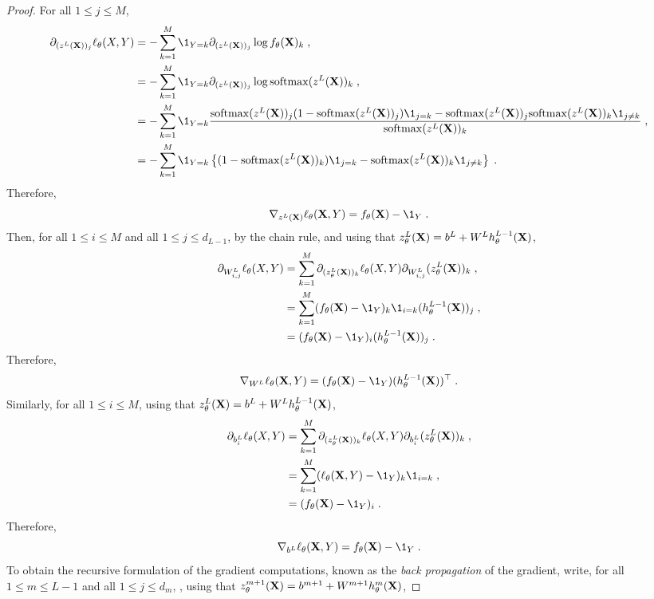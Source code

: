 \begin{proof}
For all $1\leqslant j\leqslant M$,
\begin{align*}
\partial_{(z^L(\bX))_j}\ell_{\theta}(X,Y) &=  -\sum_{k=1}^{M} \1_{Y=k}\partial_{(z^L(\bX))_j}\log f_{\theta}(\bX)_k\eqsp,\\
&=  -\sum_{k=1}^{M} \1_{Y=k}\partial_{(z^L(\bX))_j}\log \mathrm{softmax}(z^L(\bX))_k\eqsp,\\
&=  -\sum_{k=1}^{M} \1_{Y=k}\frac{\mathrm{softmax}(z^L(\bX))_j (1-\mathrm{softmax}(z^L(\bX))_j )\1_{j=k} - \mathrm{softmax}(z^L(\bX))_j \mathrm{softmax}(z^L(\bX))_k\1_{j\neq k}}{\mathrm{softmax}(z^L(\bX))_k}\eqsp,\\
&=  -\sum_{k=1}^{M} \1_{Y=k}\left\{(1-\mathrm{softmax}(z^L(\bX))_k )\1_{j=k} -  \mathrm{softmax}(z^L(\bX))_k\1_{j\neq k}\right\}\eqsp.
\end{align*}
Therefore,
$$
\nabla_{z^L(\bX)} \ell_{\theta}(\bX,Y) = f_{\theta}(\bX) - \1_Y\eqsp.
$$
Then, for all $1\leqslant i\leqslant M$ and all $1\leqslant j \leqslant d_{L-1}$, by the chain rule, and using that $z_{\theta}^L(\mathbf{X}) = b^L + W^Lh_{\theta}^{L-1}(\mathbf{X})$,
\begin{align*}
\partial_{W^L_{i,j}}\ell_{\theta}(X,Y) &=  \sum_{k=1}^{M} \partial_{(z_{\theta}^L(\bX))_k}\ell_{\theta}(X,Y)\partial_{W^L_{i,j}}(z_{\theta}^L(\bX))_k\eqsp,\\
&=  \sum_{k=1}^{M} (f_{\theta}(\bX) - \1_Y)_k\1_{i=k}(h_{\theta}^{L-1}(\bX))_j\eqsp,\\
&=  (f_{\theta}(\bX) - \1_Y)_i(h_{\theta}^{L-1}(\bX))_j\eqsp.
\end{align*}
Therefore,
$$
\nabla_{W^L} \ell_{\theta}(\bX,Y) = (f_{\theta}(\bX) - \1_Y)(h_{\theta}^{L-1}(\bX))^\top\eqsp.
$$
Similarly, for all $1\leqslant i\leqslant M$,  using that $z_{\theta}^L(\mathbf{X}) = b^L + W^Lh_{\theta}^{L-1}(\mathbf{X})$,
\begin{align*}
\partial_{b^L_{i}}\ell_{\theta}(X,Y) &=  \sum_{k=1}^{M} \partial_{(z_{\theta}^L(\bX))_k}\ell_{\theta}(X,Y)\partial_{b^L_{i}}(z_{\theta}^L(\bX))_k\eqsp,\\
&=  \sum_{k=1}^{M} (\ell_{\theta}(\bX,Y) - \1_Y)_k\1_{i=k}\eqsp,\\
&=  (f_{\theta}(\bX) - \1_Y)_i\eqsp.
\end{align*}
Therefore,
$$
\nabla_{b^L} \ell_{\theta}(\bX,Y) = f_{\theta}(\bX) - \1_Y\eqsp.
$$
To obtain the recursive formulation of the gradient computations, known as the {\em back propagation} of the gradient, write, for all $1\leqslant m \leqslant L-1$ and all $1\leqslant j \leqslant d_m$, ,  using that $z_{\theta}^{m+1}(\mathbf{X}) = b^{m+1} + W^{m+1}h_{\theta}^{m}(\mathbf{X})$,

\end{proof}
